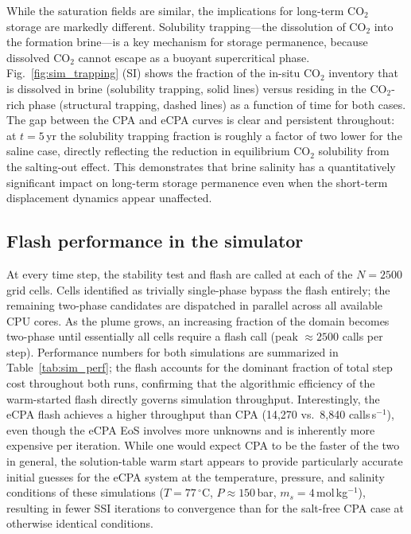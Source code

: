 \documentclass[preprint,12pt,authoryear]{elsarticle}
\begin{document}
While the saturation fields are similar, the implications for long-term CO$_2$ storage
are markedly different.
Solubility trapping---the dissolution of CO$_2$ into the formation brine---is a key
mechanism for storage permanence, because dissolved CO$_2$ cannot escape as a
buoyant supercritical phase.
Fig.~\ref{fig:sim_trapping} (SI) shows the fraction of the in-situ CO$_2$ inventory that
is dissolved in brine (solubility trapping, solid lines) versus residing in the
CO$_2$-rich phase (structural trapping, dashed lines) as a function of time for both
cases.
The gap between the CPA and eCPA curves is clear and persistent throughout: at $t = 5$\,yr
the solubility trapping fraction is roughly a factor of two lower for the saline case,
directly reflecting the reduction in equilibrium CO$_2$ solubility from the salting-out
effect.
This demonstrates that brine salinity has a quantitatively significant impact on
long-term storage permanence even when the short-term displacement dynamics appear
unaffected.

\subsection{Flash performance in the simulator}
\label{sec:sim_perf}

At every time step, the stability test and flash are called at each of the $N = 2500$
grid cells.
Cells identified as trivially single-phase bypass the flash
entirely; the remaining two-phase candidates are dispatched in parallel across all
available CPU cores.
As the plume grows, an increasing fraction of the domain becomes two-phase until
essentially all cells require a flash call (peak ${\approx}2500$ calls per step).
Performance numbers for both simulations are summarized in Table~\ref{tab:sim_perf};
the flash accounts for the dominant fraction of total step cost throughout both runs,
confirming that the algorithmic efficiency of the warm-started flash directly governs
simulation throughput.
Interestingly, the eCPA flash achieves a higher throughput than CPA (14{,}270 vs.\
8{,}840 calls\,s$^{-1}$), even though the eCPA EoS involves more unknowns and is
inherently more expensive per iteration.
While one would expect CPA to be the faster of the two in general, the solution-table
warm start appears to provide particularly accurate initial guesses for the eCPA system
at the temperature, pressure, and salinity conditions of these simulations ($T = 77\,^\circ$C,
$P \approx 150$\,bar, $m_s = 4$\,mol\,kg$^{-1}$), resulting in fewer SSI iterations
to convergence than for the salt-free CPA case at otherwise identical conditions.
\end{document}
